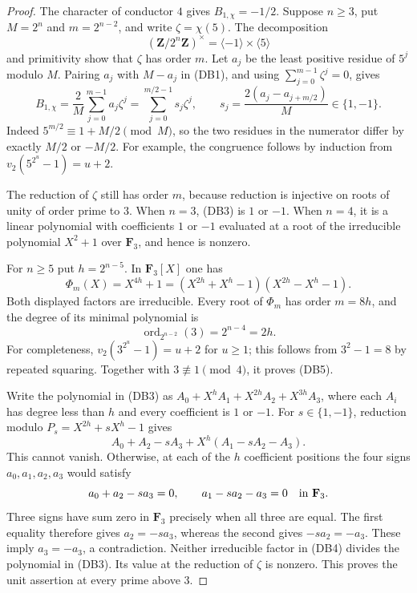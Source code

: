 \begin{proof}
The character of conductor $4$ gives $B_{1,\chi}=-1/2$.
Suppose $n\ge3$, put $M=2^n$ and $m=2^{n-2}$, and write
$\zeta=\chi(5)$.  The decomposition
\[
 (\mathbf Z/2^n\mathbf Z)^\times=\langle-1\rangle\times
                                      \langle5\rangle
\]
and primitivity show that $\zeta$ has order $m$.
Let $a_j$ be the least positive residue of $5^j$ modulo $M$.
Pairing $a_j$ with $M-a_j$ in (DB1), and using
$\sum_{j=0}^{m-1}\zeta^j=0$, gives
\[
 B_{1,\chi}=\frac2M\sum_{j=0}^{m-1}a_j\zeta^j
           =\sum_{j=0}^{m/2-1}s_j\zeta^j,
 \qquad s_j=\frac{2(a_j-a_{j+m/2})}{M}\in\{1,-1\}.
                                                               \tag{DB3}
\]
Indeed $5^{m/2}\equiv1+M/2\pmod M$, so the two residues
in the numerator differ by exactly $M/2$ or $-M/2$.
For example, the congruence follows by induction from
$v_2(5^{2^u}-1)=u+2$.

The reduction of $\zeta$ still has order $m$, because reduction
is injective on roots of unity of order prime to $3$.
When $n=3$, (DB3) is $1$ or $-1$.  When $n=4$, it is
a linear polynomial with coefficients $1$ or $-1$ evaluated
at a root of the irreducible polynomial $X^2+1$ over
$\mathbf F_3$, and hence is nonzero.

For $n\ge5$ put $h=2^{n-5}$.  In $\mathbf F_3[X]$ one has
\[
 \Phi_m(X)=X^{4h}+1
    =(X^{2h}+X^h-1)(X^{2h}-X^h-1).                            \tag{DB4}
\]
Both displayed factors are irreducible.  Every root of
$\Phi_m$ has order $m=8h$, and the degree of its minimal
polynomial is
\[
                 \operatorname{ord}_{2^{n-2}}(3)=2^{n-4}=2h.
                                                               \tag{DB5}
\]
For completeness, $v_2(3^{2^u}-1)=u+2$ for $u\ge1$;
this follows from $3^2-1=8$ by repeated squaring.
Together with $3\not\equiv1\pmod4$, it proves (DB5).

Write the polynomial in (DB3) as
$A_0+X^hA_1+X^{2h}A_2+X^{3h}A_3$, where each $A_i$
has degree less than $h$ and every coefficient is $1$ or $-1$.
For $s\in\{1,-1\}$, reduction modulo
$P_s=X^{2h}+sX^h-1$ gives
\[
           A_0+A_2-sA_3+X^h(A_1-sA_2-A_3).                    \tag{DB6}
\]
This cannot vanish.  Otherwise, at each of the $h$ coefficient
positions the four signs $a_0,a_1,a_2,a_3$ would satisfy
\[
           a_0+a_2-sa_3=0,\qquad a_1-sa_2-a_3=0
                                \quad\hbox{in }\mathbf F_3.
\]
Three signs have sum zero in $\mathbf F_3$ precisely when
all three are equal.  The first equality therefore gives
$a_2=-sa_3$, whereas the second gives $-sa_2=-a_3$.
These imply $a_3=-a_3$, a contradiction.
Neither irreducible factor in (DB4) divides the polynomial
in (DB3).  Its value at the reduction of $\zeta$ is nonzero.
This proves the unit assertion at every prime above $3$.


\end{proof}
